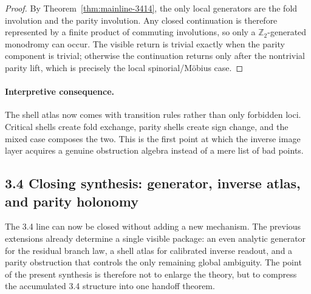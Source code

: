 \begin{proof}
By Theorem~\ref{thm:mainline-3414}, the only local generators are the fold involution and the parity involution. Any closed continuation is therefore represented by a finite product of commuting involutions, so only a $\mathbb Z_2$-generated monodromy can occur. The visible return is trivial exactly when the parity component is trivial; otherwise the continuation returns only after the nontrivial parity lift, which is precisely the local spinorial/M\"obius case.
\end{proof}

\paragraph{Interpretive consequence.}
The shell atlas now comes with transition rules rather than only forbidden loci. Critical shells create fold exchange, parity shells create sign change, and the mixed case composes the two. This is the first point at which the inverse image layer acquires a genuine obstruction algebra instead of a mere list of bad points.


\subsection*{3.4 Closing synthesis: generator, inverse atlas, and parity holonomy}
The 3.4 line can now be closed without adding a new mechanism. The previous extensions already determine a single visible package: an even analytic generator for the residual branch law, a shell atlas for calibrated inverse readout, and a parity obstruction that controls the only remaining global ambiguity. The point of the present synthesis is therefore not to enlarge the theory, but to compress the accumulated 3.4 structure into one handoff theorem.

